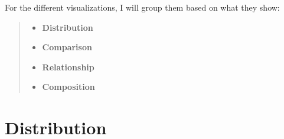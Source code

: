 \documentclass[
  letterpaper,
  DIV=11,
  numbers=noendperiod]{scrreprt}
\begin{document}
For the different visualizations, I will group them based on what they
show:

\begin{quote}
\begin{itemize}
\item
  \textbf{Distribution}
\item
  \textbf{Comparison}
\item
  \textbf{Relationship}
\item
  \textbf{Composition}
\end{itemize}
\end{quote}

\hypertarget{distribution}{%
\section{Distribution}\label{distribution}}
\end{document}

